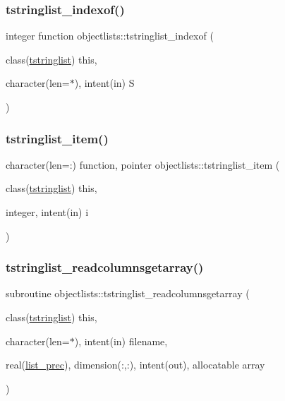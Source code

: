 \subsubsection{\texorpdfstring{tstringlist\+\_\+indexof()}{tstringlist\_indexof()}}
{\footnotesize\ttfamily integer function objectlists\+::tstringlist\+\_\+indexof (\begin{DoxyParamCaption}\item[{class(\mbox{\hyperlink{structobjectlists_1_1tstringlist}{tstringlist}})}]{this,  }\item[{character(len=$\ast$), intent(in)}]{S }\end{DoxyParamCaption})\hspace{0.3cm}{\ttfamily [private]}}

\mbox{\label{namespaceobjectlists_ab724d2c89c530b6df64385c55bdc6377}} 
\subsubsection{\texorpdfstring{tstringlist\+\_\+item()}{tstringlist\_item()}}
{\footnotesize\ttfamily character(len=\+:) function, pointer objectlists\+::tstringlist\+\_\+item (\begin{DoxyParamCaption}\item[{class(\mbox{\hyperlink{structobjectlists_1_1tstringlist}{tstringlist}})}]{this,  }\item[{integer, intent(in)}]{i }\end{DoxyParamCaption})\hspace{0.3cm}{\ttfamily [private]}}

\mbox{\label{namespaceobjectlists_adea8776aebb466be94d770772a73f756}} 
\subsubsection{\texorpdfstring{tstringlist\+\_\+readcolumnsgetarray()}{tstringlist\_readcolumnsgetarray()}}
{\footnotesize\ttfamily subroutine objectlists\+::tstringlist\+\_\+readcolumnsgetarray (\begin{DoxyParamCaption}\item[{class(\mbox{\hyperlink{structobjectlists_1_1tstringlist}{tstringlist}})}]{this,  }\item[{character(len=$\ast$), intent(in)}]{filename,  }\item[{real(\mbox{\hyperlink{namespaceobjectlists_a9d176bc6347eefeceba8cb520c6be81c}{list\+\_\+prec}}), dimension(\+:,\+:), intent(out), allocatable}]{array }\end{DoxyParamCaption})\hspace{0.3cm}{\ttfamily [private]}}



